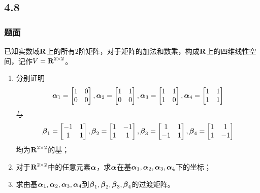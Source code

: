 \documentclass{beamer}
\begin{document}
\subsection*{4.8}
\begin{frame}
    \frametitle{题面}
    已知实数域\(\boldsymbol{\mathrm{R}}\)上的所有\(2\)阶矩阵，对于矩阵的加法和数乘，构成\(\boldsymbol{\mathrm{R}}\)上的四维线性空间，记作\(V=\boldsymbol{\mathrm{R}}^{2\times2}\)。
    \begin{enumerate}
        \item {
              分别证明
              \begin{equation*}
                  \boldsymbol{\alpha}_1=\begin{bmatrix}1&0\\0&0\end{bmatrix},
                  \boldsymbol{\alpha}_2=\begin{bmatrix}1&1\\0&0\end{bmatrix},
                  \boldsymbol{\alpha}_3=\begin{bmatrix}1&1\\1&0\end{bmatrix},
                  \boldsymbol{\alpha}_4=\begin{bmatrix}1&1\\1&1\end{bmatrix}
              \end{equation*}
              与
              \begin{equation*}
                  \boldsymbol{\beta}_1=\begin{bmatrix}-1&1\\1&1\end{bmatrix},
                  \boldsymbol{\beta}_2=\begin{bmatrix}1&-1\\1&1\end{bmatrix},
                  \boldsymbol{\beta}_3=\begin{bmatrix}1&1\\-1&1\end{bmatrix},
                  \boldsymbol{\beta}_4=\begin{bmatrix}1&1\\1&-1\end{bmatrix}
              \end{equation*}
              均为\(\boldsymbol{\mathrm{R}}^{2\times2}\)的基；}
        \item 对于\(\boldsymbol{\mathrm{R}}^{2\times2}\)中的任意元素\(\boldsymbol{\alpha}\)，求\(\boldsymbol{\alpha}\)在基\(\boldsymbol{\alpha}_1,\boldsymbol{\alpha}_2,\boldsymbol{\alpha}_3,\boldsymbol{\alpha}_4\)下的坐标；
        \item 求由基\(\boldsymbol{\alpha}_1,\boldsymbol{\alpha}_2,\boldsymbol{\alpha}_3,\boldsymbol{\alpha}_4\)到\(\boldsymbol{\beta}_1,\boldsymbol{\beta}_2,\boldsymbol{\beta}_3,\boldsymbol{\beta}_4\)的过渡矩阵。
    \end{enumerate}
\end{frame}
\end{document}
